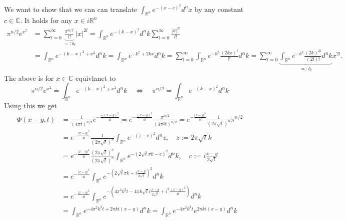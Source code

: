 \documentclass[A4,12pt,twoside]{book}
\begin{document}
We want to show that we can can translate $\int_{\mathbb{R}^n} e^{-(x-c)^2} d^n x$ by any constant $c \in \mathbb{C}$. It holds for any $x \in i \mathbb{R}^n$
\begin{align*}
    \pi^{n/2} e^{x^2}&=  \sum_{l=0}^\infty \underbrace{\frac{\pi^{n/2}}{l!}}_{=:a_l} |x|^{2l}= \int_{\mathbb{R}^n} e^{-(k-x)^2} d^n k \sum_{l=0}^\infty \frac{|x|^{2l}}{l!} \\
    &= \int_{\mathbb{R}^n} e^{-(k-x)^2+x^2} d^n k = \int_{\mathbb{R}^n} e^{-k^2 + 2kx} d^n k = \sum_{l=0}^\infty \int_{\mathbb{R}^n} e^{-k^2} \frac{(2kx)^l}{l!} d^n k =  \sum_{l=0}^\infty \underbrace{\int_{\mathbb{R}^n} e^{-k^2} \frac{(2k)^{2l}}{(2l)!} d^n k}_{=:b_l} x^{2l} .
\end{align*}
The above is for $x \in \mathbb{C}$ equivlanet to 
\[
 \pi^{n/2} e^{x^2} = \int_{\mathbb{R}^n} e^{-(k-x)^2+x^2} d^n k  \quad \iff \quad \pi^{n/2}  = \int_{\mathbb{R}^n} e^{-(k-x)^2} d^n k
\]
Using this we get
\begin{align*}
    \Phi (x-y,t) &= \frac{1}{(4 \pi t)^{n/2}} e^{- \frac{-(x-y)^2}{4t}}= e^{- \frac{(x-y)^2}{4t}} \frac{\pi^{n/2}}{(4 \pi^2 t)^{n/2}} = e^{ - \frac{|x-y|^2}{4t}} \frac{1}{(2 \pi \sqrt{t} )^n } \pi^{n/2} \\
    &=e^{ - \frac{|x-y|^2}{4t}} \frac{1}{(2 \pi \sqrt{t} )^n } \int_{\mathbb{R}^n} e^{-(z-c)^2} d^n z, \quad z:= 2 \pi \sqrt{t} k \\
    &= e^{ - \frac{|x-y|^2}{4t}}  \frac{(2 \pi \sqrt{t} )^n}{(2 \pi \sqrt{t} )^n }  \int_{\mathbb{R}^n} e^{ - (2 \sqrt{t} \pi k -c)^2} d^n k, \quad c:= i \frac{x-y}{2 \sqrt{t}}\\
    &= e^{ - \frac{|x-y|^2}{4t}} \int_{\mathbb{R}^n} e^{ - (2 \sqrt{t} \pi k -i \frac{x-y}{2 \sqrt{t}})^2} d^n k\\
    &= e^{ - \frac{|x-y|^2}{4t}} \int_{\mathbb{R}^n} e^{ - \left( 4 \pi^2 k^2 t - 4 \pi k \sqrt{t} i \frac{x-y}{2 \sqrt{t}} + i^2 \frac{(x-y)^2}{4t} \right)} d^n k\\
    &=  \int_{\mathbb{R}^n} e^{ - 4 \pi^2 k^2 t + 2 \pi k  i (x-y) }  d^n k=  \int_{\mathbb{R}^n} e^{ - 4 \pi^2 k^2 t }  e^{2 \pi k  i (x-y) }  d^n k
\end{align*}
\end{document}
